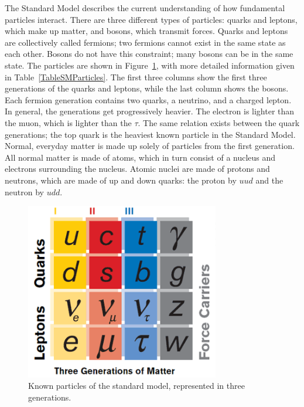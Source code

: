 The Standard Model describes the current understanding 
of how fundamental particles interact.  
There are three different types of particles: 
quarks and leptons, 
which make up matter, 
and bosons, which transmit forces.  
Quarks and leptons are collectively called fermions; 
two fermions cannot exist in the same state as each other.  
Bosons do not have this constraint; 
many bosons can be in the same state.  
The particles are shown in Figure~\ref{fig:StandardModel}, 
with more detailed information given in 
Table~\ref{TableSMParticles}. 
The first three columns show the first three generations 
of the quarks and leptons, 
while the last column shows the bosons.  
Each fermion generation contains two quarks, 
a neutrino, and a charged lepton.  
In general, the generations get progressively heavier.  
The electron is lighter than the muon, 
which is lighter than the $\tau$.   
The same relation exists between the quark generations; 
the top quark is the heaviest known particle in the Standard Model.  %
Normal, everyday matter is made up solely of particles 
from the first generation.  
All normal matter is made of atoms, 
which in turn consist of a nucleus and 
electrons surrounding the nucleus.  
Atomic nuclei are made of protons and neutrons, 
which are made of up and down quarks: 
the proton by $uud$ and the neutron by $udd$.  


 \begin{figure}[htb]
  \begin{center}
    \includegraphics[width=240pt]{Figures/theory-standard-model-symmetry-mag.png}
  \end{center}
  \caption[\fixspacing Particles of the standard model]
	  {\fixspacing Known particles of the standard model, 
	    represented in three generations.
	  }
  \label{fig:StandardModel}
 \end{figure}


